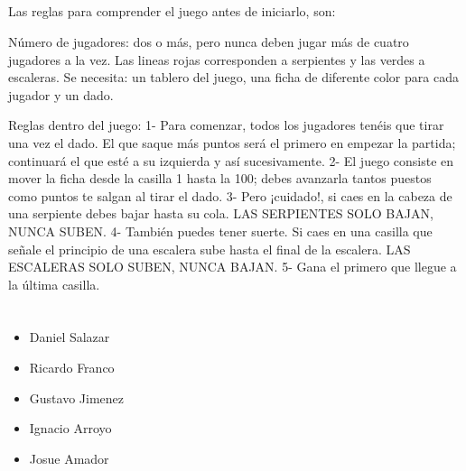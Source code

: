 \documentclass[letterpaper,10pt,english]{sphinxmanual}
\begin{document}
\subsection{}
\label{\detokenize{tutorial:reglas-del-juego}}
Las reglas para comprender el juego antes de iniciarlo, son:

Número de jugadores: dos o más, pero nunca deben jugar más de cuatro jugadores a la vez.
Las lineas rojas corresponden a serpientes y las verdes a escaleras.
Se necesita: un tablero del juego, una ficha de diferente color para cada jugador y un dado.

Reglas dentro del juego:
1- Para comenzar, todos los jugadores tenéis que tirar una vez el dado. El que saque más puntos será el primero en empezar la partida; continuará el que esté a su izquierda y así sucesivamente.
2- El juego consiste en mover la ficha desde la casilla 1 hasta la 100; debes avanzarla tantos puestos como puntos te salgan al tirar el dado.
3- Pero ¡cuidado!, si caes en la cabeza de una serpiente debes bajar hasta su cola. LAS SERPIENTES SOLO BAJAN, NUNCA SUBEN.
4- También puedes tener suerte. Si caes en una casilla que señale el principio de una escalera sube hasta el final de la escalera. LAS ESCALERAS SOLO SUBEN, NUNCA BAJAN.
5- Gana el primero que llegue a la última casilla.


\section{}
\label{\detokenize{proyecto:informacion-acerca-del-proyecto-escaleras-y-serpientes}}\label{\detokenize{proyecto::doc}}

\subsection{}
\label{\detokenize{proyecto:autores}}\begin{itemize}
\item {} 
Daniel Salazar

\item {} 
Ricardo Franco

\item {} 
Gustavo Jimenez

\item {} 
Ignacio Arroyo

\item {} 
Josue Amador

\end{itemize}
\end{document}
